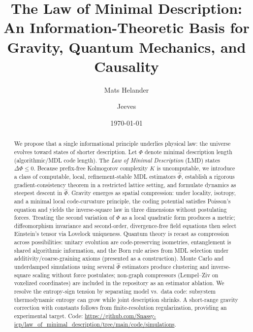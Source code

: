 \documentclass[aps,preprint,onecolumn,longbibliography,nofootinbib]{revtex4-2}
\numberwithin{equation}{section}        %
\begin{document}
\title{The Law of Minimal Description: An Information-Theoretic Basis for Gravity, Quantum Mechanics, and Causality}

\author{Mats Helander}
\author{Jeeves}

\date{\today}

\begin{abstract}
We propose that a single informational principle underlies physical law: the universe evolves toward states of shorter description. Let $\Phi$ denote minimal description length (algorithmic/MDL code length). The \emph{Law of Minimal Description} (LMD) states $\Delta\Phi\le 0$. Because prefix-free Kolmogorov complexity $K$ is uncomputable, we introduce a class of computable, local, refinement-stable MDL estimators $\widehat\Phi$, establish a rigorous gradient-consistency theorem in a restricted lattice setting, and formulate dynamics as steepest descent in $\widehat\Phi$. Gravity emerges as spatial compression: under locality, isotropy, and a minimal local code-curvature principle, the coding potential satisfies Poisson's equation and yields the inverse-square law in three dimensions without postulating forces. Treating the second variation of $\Phi$ as a local quadratic form produces a metric; diffeomorphism invariance and second-order, divergence-free field equations then select Einstein's tensor via Lovelock uniqueness. Quantum theory is recast as compression across possibilities: unitary evolution are code-preserving isometries, entanglement is shared algorithmic information, and the Born rule arises from MDL selection under additivity/coarse-graining axioms (presented as a construction). Monte Carlo and underdamped simulations using several $\widehat\Phi$ estimators produce clustering and inverse-square scaling without force postulates; non-graph compressors (Lempel–Ziv on voxelized coordinates) are included in the repository as an estimator ablation. We resolve the entropy-sign tension by separating model vs.\ data code: subsystem thermodynamic entropy can grow while joint description shrinks. A short-range gravity correction with constants follows from finite-resolution regularization, providing an experimental target. Code: \url{https://github.com/Snassy-icp/law_of_minimal_description/tree/main/code/simulations}.
\end{abstract}

\maketitle
{}
\thispagestyle{empty}
\vspace{-0.5em}
\end{document}
